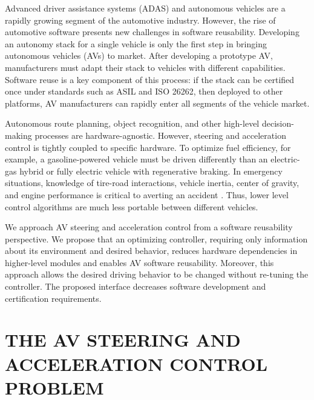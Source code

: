 \documentclass[letterpaper, 10 pt, conference]{ieeeconf}  %
\begin{document}
Advanced driver assistance systems (ADAS) and autonomous vehicles are a rapidly growing segment of the automotive industry. However, the rise of automotive software presents new challenges in software reusability.
Developing an autonomy stack for a single vehicle is only the first step in bringing autonomous vehicles (AVs) to market. After developing a prototype AV, manufacturers must adapt their stack to vehicles with different capabilities. Software reuse is a key component of this process: if the stack can be certified once under standards such as ASIL and ISO 26262, then deployed to other platforms, AV manufacturers can rapidly enter all segments of the vehicle market.

Autonomous route planning, object recognition, and other high-level decision-making processes are hardware-agnostic. However, steering and acceleration control is tightly coupled to specific hardware. To optimize fuel efficiency, for example, a gasoline-powered vehicle must be driven differently than an electric-gas hybrid or fully electric vehicle with regenerative braking. In emergency situations, knowledge of tire-road interactions, vehicle inertia, center of gravity, and engine performance is critical to averting an accident \cite{beal}. Thus, lower level control algorithms are much less portable between different vehicles.

We approach AV steering and acceleration control from a software reusability perspective. We propose that an optimizing controller, requiring only information about its environment and desired behavior, reduces hardware dependencies in higher-level modules and enables AV software reusability. Moreover, this approach allows the desired driving behavior to be changed without re-tuning the controller. The proposed interface decreases software development and certification requirements.


\section{THE AV STEERING AND ACCELERATION CONTROL PROBLEM}
\end{document}
